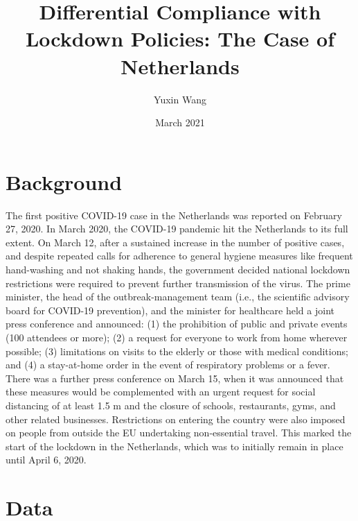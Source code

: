 \documentclass{article}
\title{Differential Compliance with Lockdown Policies: The Case of Netherlands}
\author{Yuxin Wang}
\date{March 2021}
\begin{document}
\maketitle

\section{Background}
The first positive COVID-19 case in the Netherlands was reported on February 27, 2020. In March 2020, the COVID-19 pandemic hit the Netherlands to its full extent. On March 12, after a sustained increase in the number of positive cases, and despite repeated calls for adherence to general hygiene measures like frequent hand-washing and not shaking hands, the government decided national lockdown restrictions were required to prevent further transmission of the virus. The prime minister, the head of the outbreak-management team (i.e., the scientific advisory board for COVID-19 prevention), and the minister for healthcare held a joint press conference and announced: (1) the prohibition of public and private events (100 attendees or more); (2) a request for everyone to work from home wherever possible; (3) limitations on visits to the elderly or those with medical conditions; and (4) a stay-at-home order in the event of respiratory problems or a fever. There was a further press conference on March 15, when it was announced that these measures would be complemented with an urgent request for social distancing of at least 1.5 m and the closure of schools, restaurants, gyms, and other related businesses. Restrictions on entering the country were also imposed on people from outside the EU undertaking non-essential travel. This marked the start of the lockdown in the Netherlands, which was to initially remain in place until April 6, 2020.


\section{Data}
\end{document}
